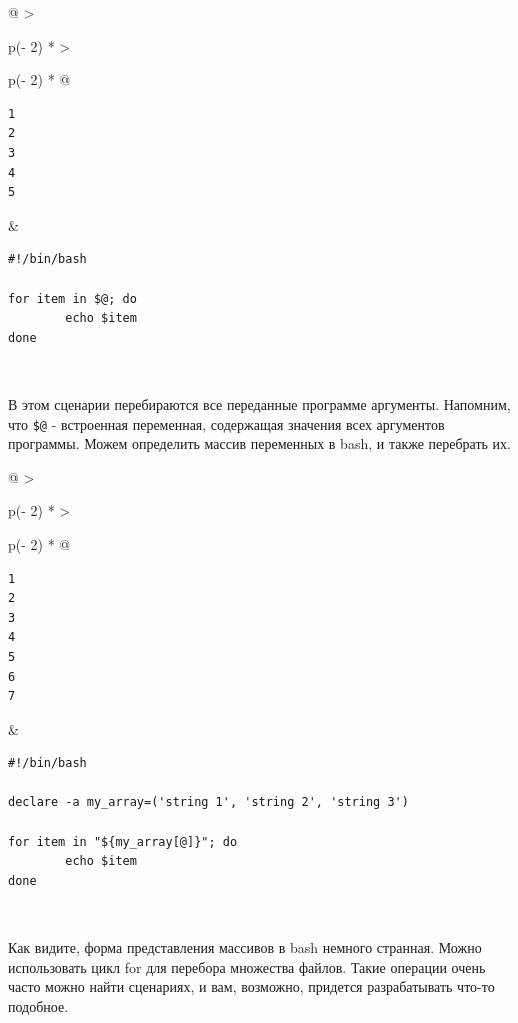 \documentclass{report}
\begin{document}
\begin{longtable}[]{@{}
  >{\raggedright\arraybackslash}p{(\columnwidth - 2\tabcolsep) * }
  >{\raggedright\arraybackslash}p{(\columnwidth - 2\tabcolsep) * }@{}}
\toprule
\endhead
\begin{minipage}[t]{\linewidth}\raggedright
\begin{verbatim}
1
2
3
4
5
\end{verbatim}
\end{minipage} & \begin{minipage}[t]{\linewidth}\raggedright
\begin{verbatim}
#!/bin/bash

for item in $@; do
        echo $item
done
\end{verbatim}
\end{minipage} \\ \addlinespace
\bottomrule
\end{longtable}

В этом сценарии перебираются все переданные программе аргументы.
Напомним, что \texttt{\$@} - встроенная переменная, содержащая значения
всех аргументов программы. Можем определить массив переменных в bash, и
также перебрать их.

\begin{longtable}[]{@{}
  >{\raggedright\arraybackslash}p{(\columnwidth - 2\tabcolsep) * }
  >{\raggedright\arraybackslash}p{(\columnwidth - 2\tabcolsep) * }@{}}
\toprule
\endhead
\begin{minipage}[t]{\linewidth}\raggedright
\begin{verbatim}
1
2
3
4
5
6
7
\end{verbatim}
\end{minipage} & \begin{minipage}[t]{\linewidth}\raggedright
\begin{verbatim}
#!/bin/bash

declare -a my_array=('string 1', 'string 2', 'string 3')

for item in "${my_array[@]}"; do
        echo $item
done
\end{verbatim}
\end{minipage} \\ \addlinespace
\bottomrule
\end{longtable}

Как видите, форма представления массивов в bash немного странная. Можно
использовать цикл for для перебора множества файлов. Такие операции
очень часто можно найти сценариях, и вам, возможно, придется
разрабатывать что-то подобное.
\end{document}
